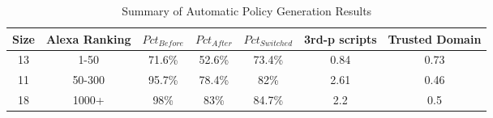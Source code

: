 \begin{table}
\begin{center}
\begin{threeparttable}
\begin{tabular}{|c|c|c|c|c|c|c|}
\hline
 Size\hspace{1mm} & Alexa Ranking\hspace{1mm} & ${Pct}_{Before}$\hspace{1mm} & ${Pct}_{After}$\hspace{1mm} & ${Pct}_{Switched}$\hspace{1mm} &
		3rd-p scripts\hspace{1mm} & Trusted Domain\hspace{1mm} \\
\hline
13 & 1-50 & 71.6\% & 52.6\% & 73.4\% & 0.84 & 0.73\\
\hline
11 & 50-300 & 95.7\% & 78.4\% & 82\% & 2.61 & 0.46\\
\hline
18 & 1000+ & 98\% & 83\% & 84.7\% & 2.2 & 0.5\\
\hline
\end{tabular}
\end{threeparttable}
\end{center}
\caption{Summary of Automatic Policy Generation Results}
\label{tab:esorics_eval_policystat}
\end{table}